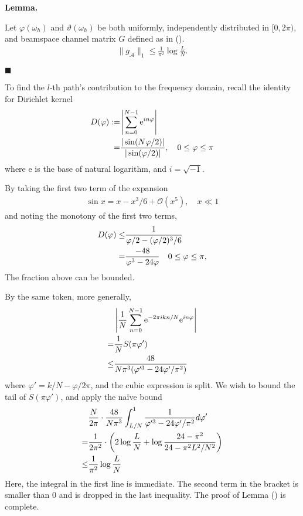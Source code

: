 \documentclass[12pt]{article}
\newcommand{\MC}[1]{\mathcal{#1}}
\newcommand{\RM}[1]{\mathrm{#1}}
\newcounter{NumResult}
\newcommand{\myCount}
{
   \stepcounter{NumResult}
   \textbf{\arabic{NumResult}}
}
\newcommand {\Result} [2]
{
   \bigskip
   \myCount \textbf{#1} \par
   {#2} \par
   \hfill \(\blacksquare\)
   \bigskip
}
\begin{document}
\Result
{Lemma.}
{
Let \(\varphi(\omega_h)\) and \(\vartheta(\omega_h)\) be both uniformly, independently distributed in \([0,2\pi)\), and beamspace channel matrix \(G\) defined as in ().
\begin{gather}
\|g_{\MC{A}}\|_1 \leq \frac{1}{\pi^2} \log \frac{L}{N}.
\end{gather}
}

To find the \(l\)-th path's contribution to the frequency domain, recall the identity for Dirichlet kernel
\begin{align}
D(\varphi)
:=&\left| \sum_{n=0}^{N-1} \RM{e}^{i n \varphi} \right| \\ \notag
=&\frac{|\sin(N \varphi/2)|}{|\sin(\varphi /2)|},
\quad 0 \leq \varphi \leq \pi
\end{align}
where \(\RM{e}\) is the base of natural logarithm, and \(i =\sqrt{-1}\).

By taking the first two term of the expansion
\begin{align}
\sin x =x -x^3/6 + \MC{O}(x^5), \quad x \ll 1
\end{align}
and noting the monotony of the first two terms,
\begin{align}
D(\varphi)
\leq& \frac{1}{\varphi/2 -(\varphi/2)^3/6} \notag \\
=& \frac{-48}{\varphi^3 -24\varphi}
\quad 0 \leq \varphi \leq \pi,
\end{align}
The fraction above can be bounded.

By the same token, more generally,
\begin{align}
&\left| \frac{1}{N} \sum_{n=0}^{N-1} \RM{e}^{-2\pi i k n/N} \RM{e}^{i n \varphi} \right| \notag \\
=&\frac{1}{N} S(\pi \varphi') \notag \\
\leq& \frac{48}{N \pi^3 (\varphi'^3 -24 \varphi' /\pi^2)}
\end{align}
where \(\varphi' =k/N -\varphi/2\pi\), and the cubic expression is split.
We wish to bound the tail of \(S(\pi \varphi')\), and apply the na\"ive bound
\begin{align}
&\frac{N}{2\pi} \cdot \frac{48}{N \pi^3} \int_{L/N}^1 \frac{1}{\varphi'^3 -24 \varphi' /\pi^2}
 d\varphi' \notag \\
=&\frac{1}{2\pi^2} \cdot \left( 2 \log \frac{L}{N} +\log \frac{24-\pi^2}{24-\pi^2 L^2 /N^2} \right) \notag \\
\leq& \frac{1}{\pi^2} \log \frac{L}{N}
\end{align}
Here, the integral in the first line is immediate.
The second term in the bracket is smaller than 0 and is dropped in the last inequality.
The proof of Lemma () is complete.
\end{document}
